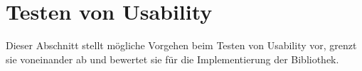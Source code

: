 \section{Testen von Usability}
\label{usability_testing}

Dieser Abschnitt stellt mögliche Vorgehen beim Testen von Usability vor, grenzt sie voneinander ab und bewertet sie für die Implementierung der Bibliothek. 


\cite{usabilityblog_wasBeachten}

\cite{usabilityblog_eResult}